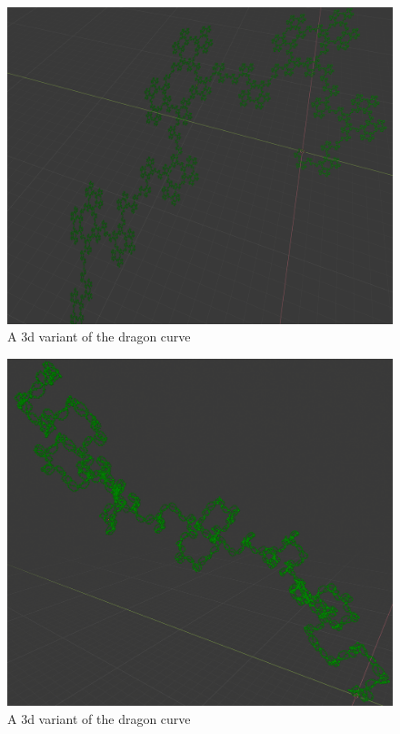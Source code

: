 \begin{figure}[H]
    \centering
    \includegraphics[width=\textwidth]{figures/L-systems/dragon2-3d.png}
    \caption{A 3d variant of the dragon curve}
\end{figure}

\begin{figure}[H]
    \centering
    \includegraphics[width=\textwidth]{figures/L-systems/dragon3-3d.png}
    \caption{A 3d variant of the dragon curve}
\end{figure}

